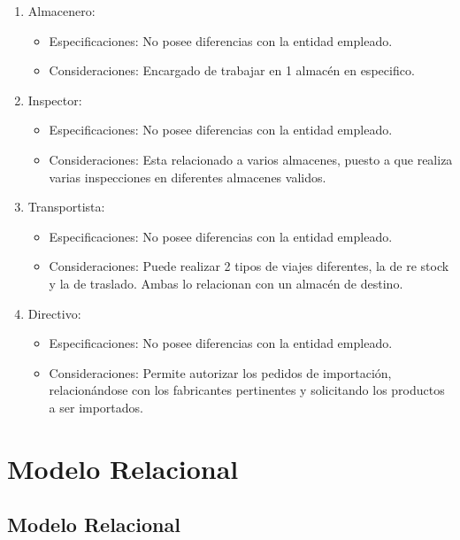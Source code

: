 \documentclass[10pt, a4paper,openany]{report}
\begin{document}
\begin{enumerate}
	\item Almacenero:
	      \begin{itemize}
		      \item Especificaciones:
		            No posee diferencias con la entidad empleado.
		      \item Consideraciones:
		            Encargado de  trabajar en 1 almacén en especifico.
	      \end{itemize}

	\item Inspector:
	      \begin{itemize}
		      \item Especificaciones:
		            No posee diferencias con la entidad empleado.
		      \item Consideraciones:
		            Esta relacionado a varios almacenes, puesto a que realiza varias inspecciones en diferentes almacenes validos.
	      \end{itemize}

	\item Transportista:
	      \begin{itemize}
		      \item Especificaciones:
		            No posee diferencias con la entidad empleado.
		      \item Consideraciones:
		            Puede realizar 2 tipos de viajes diferentes, la de re stock y la de traslado. Ambas lo relacionan con un almacén de destino.
	      \end{itemize}

	\item Directivo:
	      \begin{itemize}
		      \item Especificaciones:
		            No posee diferencias con la entidad empleado.
		      \item Consideraciones:
		            Permite autorizar los pedidos de importación, relacionándose con los fabricantes pertinentes y solicitando los productos a ser importados.
	      \end{itemize}
\end{enumerate}


\chapter{Modelo Relacional} %
\label{chap:Modelo Relacional}

\section{Modelo Relacional} %
\label{sec:Modelo Relacional}
\end{document}
